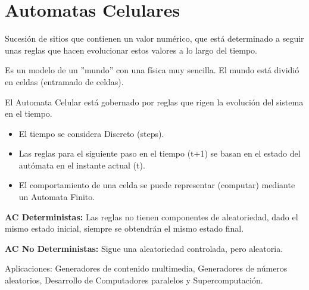 \section{Automatas Celulares}
Sucesión de sitios que contienen un valor numérico, que está determinado a seguir unas reglas que hacen evolucionar estos valores a lo largo del tiempo.

Es un modelo de un ''mundo'' con una física muy sencilla. El mundo está dividió en celdas (entramado de celdas).

El Automata Celular está gobernado por reglas que rigen la evolución del sistema en el tiempo.
\begin{itemize}
    \item El tiempo se considera Discreto (steps).
    \item Las reglas para el siguiente paso en el tiempo (t+1) se basan en el estado del autómata en el instante actual (t).
    \item El comportamiento de una celda se puede representar (computar) mediante un Automata Finito.
\end{itemize}

\textbf{AC Deterministas:} Las reglas no tienen componentes de aleatoriedad, dado el mismo estado inicial, siempre se obtendrán el mismo estado final.

\textbf{AC No Deterministas:} Sigue una aleatoriedad controlada, pero aleatoria.

Aplicaciones: Generadores de contenido multimedia, Generadores de números aleatorios, Desarrollo de Computadores paralelos y Supercomputación.

